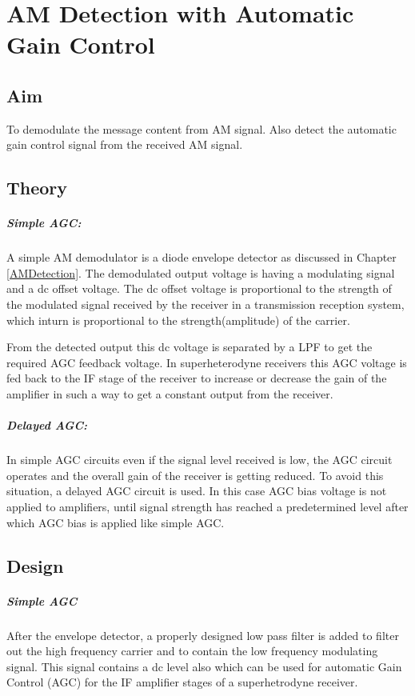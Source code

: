 \chapter[AM Detection with Automatic Gain Control]{AM Detection with Automatic Gain Control}
\section*{Aim}
To demodulate the message content from AM signal. Also detect the automatic gain control signal from the received AM signal.
\section*{Theory}
\paragraph{Simple AGC:}

A simple AM demodulator is a diode envelope detector as discussed in  Chapter \ref{AMDetection}. The demodulated output voltage is having a modulating signal and a dc offset voltage. The dc offset voltage is proportional to the strength of the modulated signal received by the receiver in a transmission reception system, which inturn is proportional to the strength(amplitude) of the carrier.

From the detected output this dc voltage is separated by a LPF to get the required AGC feedback voltage. In superheterodyne receivers this AGC voltage is fed back to the IF stage of the receiver to increase or decrease the gain of the amplifier in such a way to get a constant output from the receiver.

\paragraph{Delayed AGC:}In simple AGC circuits even if the signal level received is low, the AGC circuit operates and the overall gain of the receiver is getting reduced. To avoid this situation, a delayed AGC circuit is used. In this case AGC bias voltage is not applied to amplifiers, until signal strength has reached a predetermined level after which AGC bias is applied like simple AGC.

\section*{Design}
\paragraph{Simple AGC}
 After the envelope detector, a properly designed low pass filter is added to filter out the high frequency carrier and to contain the low frequency modulating signal. This signal contains a dc level also which can be used for automatic Gain Control (AGC) for the IF amplifier stages of a superhetrodyne receiver.

